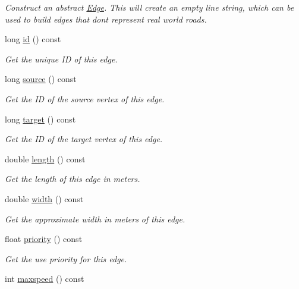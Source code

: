\begin{DoxyCompactItemize}
\begin{DoxyCompactList}\small\item\em Construct an abstract \hyperlink{classgeo_1_1Edge}{Edge}. This will create an empty line string, which can be used to build edges that don\textquotesingle{}t represent real world roads. \end{DoxyCompactList}\item 
long \hyperlink{classgeo_1_1Edge_a459268032f5d9ccf412b66569f5ac258}{id} () const 
\begin{DoxyCompactList}\small\item\em Get the unique ID of this edge. \end{DoxyCompactList}\item 
long \hyperlink{classgeo_1_1Edge_a01e03971727a7ee252b64c4a5991aae3}{source} () const 
\begin{DoxyCompactList}\small\item\em Get the ID of the source vertex of this edge. \end{DoxyCompactList}\item 
long \hyperlink{classgeo_1_1Edge_a2710a346c2eec1dc979d529f7067e7c9}{target} () const 
\begin{DoxyCompactList}\small\item\em Get the ID of the target vertex of this edge. \end{DoxyCompactList}\item 
double \hyperlink{classgeo_1_1Edge_a752e5cfb9e469a1523fad88088167874}{length} () const 
\begin{DoxyCompactList}\small\item\em Get the length of this edge in meters. \end{DoxyCompactList}\item 
double \hyperlink{classgeo_1_1Edge_a3f7e577f1218b742a387fe9c23030689}{width} () const 
\begin{DoxyCompactList}\small\item\em Get the approximate width in meters of this edge. \end{DoxyCompactList}\item 
float \hyperlink{classgeo_1_1Edge_a23de2560879285876899961e614fc433}{priority} () const 
\begin{DoxyCompactList}\small\item\em Get the use priority for this edge. \end{DoxyCompactList}\item 
int \hyperlink{classgeo_1_1Edge_ab2913bedb82fd1e24e0c99d5ea6c7a87}{maxspeed} () const 

\end{DoxyCompactItemize}
